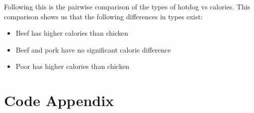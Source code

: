 \documentclass[paper=a4, fontsize=11pt]{scrartcl} %
\numberwithin{equation}{section} %
\numberwithin{figure}{section} %
\numberwithin{table}{section} %
\begin{document}

Following this is the pairwise comparison of the types of hotdog vs calories. This comparison
shows us that the following differences in types exist:
\begin{itemize}
	\item Beef has higher calories than chicken
	\item Beef and pork have no significant calorie difference
	\item Poor has higher calories than chicken
\end{itemize}




\newpage
\section*{Code Appendix}

\end{document}
